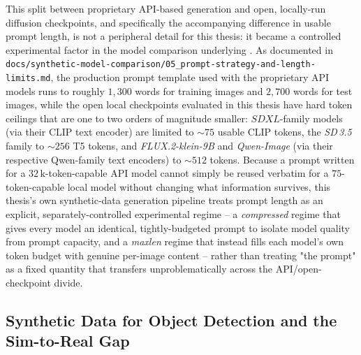 This split between proprietary API-based generation and open, locally-run diffusion checkpoints, and specifically the accompanying difference in usable prompt length, is not a peripheral detail for this thesis: it became a controlled experimental factor in the model comparison underlying . As documented in \texttt{docs/synthetic-model-comparison/05\_prompt-strategy-and-length-limits.md}, the production prompt template used with the proprietary API models runs to roughly $1{,}300$ words for training images and $2{,}700$ words for test images, while the open local checkpoints evaluated in this thesis have hard token ceilings that are one to two orders of magnitude smaller: $\mathit{SDXL}$-family models (via their CLIP text encoder) are limited to $\sim 75$ usable CLIP tokens, the \textit{SD\,3.5} family to $\sim 256$ T5 tokens, and \textit{FLUX.2-klein-9B} and \textit{Qwen-Image} (via their respective Qwen-family text encoders) to $\sim 512$ tokens. Because a prompt written for a $32\,\mathrm{k}$-token-capable API model cannot simply be reused verbatim for a $75$-token-capable local model without changing what information survives, this thesis's own synthetic-data generation pipeline treats prompt length as an explicit, separately-controlled experimental regime -- a \textit{compressed} regime that gives every model an identical, tightly-budgeted prompt to isolate model quality from prompt capacity, and a \textit{maxlen} regime that instead fills each model's own token budget with genuine per-image content -- rather than treating "the prompt" as a fixed quantity that transfers unproblematically across the API/open-checkpoint divide.

\subsection{Synthetic Data for Object Detection and the Sim-to-Real Gap}\label{sec:lit_sim_to_real}

